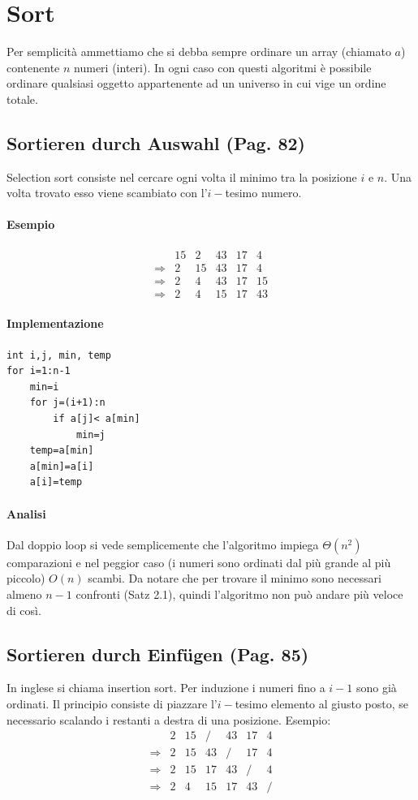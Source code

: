 \documentclass[a4paper]{book}
\newcommand{\lstIndent}{4}
\begin{document}
\chapter{Sort}
Per semplicità ammettiamo che si debba sempre ordinare un array (chiamato $a$) contenente $n$ numeri (interi). In ogni caso con questi algoritmi è possibile ordinare qualsiasi oggetto appartenente ad un universo in cui vige un ordine totale.
\section{Sortieren durch Auswahl (Pag. 82)}
Selection sort consiste nel cercare ogni volta il minimo tra la posizione $i$ e $n$. Una volta trovato esso viene scambiato con l'$i-$tesimo numero. 
\subsubsection*{Esempio}
\[\begin{array}{*{20}{c}}
{}&{15}&2&{43}&{17}&4\\
{\Rightarrow}&2&{15}&{43}&{17}&4\\
{\Rightarrow}&2&4&{43}&{17}&{15}\\
{\Rightarrow}&2&4&{15}&{17}&{43}
\end{array}\]
\subsubsection*{Implementazione}
\begin{lstlisting}[tabsize=\lstIndent]
int i,j, min, temp
for i=1:n-1
	min=i
	for j=(i+1):n
		if a[j]< a[min]
			min=j
	temp=a[min]
	a[min]=a[i]
	a[i]=temp
\end{lstlisting}
\subsubsection*{Analisi}

Dal doppio loop si vede semplicemente che l'algoritmo impiega $\Theta (n^2)$ comparazioni e nel peggior caso (i numeri sono ordinati dal più grande al più piccolo) $O(n)$ scambi. Da notare che per trovare il minimo sono necessari almeno $n-1$ confronti (Satz 2.1), quindi l'algoritmo non può andare più veloce di così. 
\section{Sortieren durch Einfügen (Pag. 85)}
In inglese si chiama insertion sort. Per induzione i numeri fino a $i-1$ sono già ordinati. Il principio consiste di piazzare l'$i-$tesimo elemento al giusto posto, se necessario scalando i restanti a destra di una posizione. Esempio:
\[\begin{array}{*{20}{c}}
{}&2&{15}&/&{43}&{17}&4\\
{\Rightarrow}&2&{15}&{43}&/&{17}&4\\
{\Rightarrow}&2&{15}&{17}&{43}&/&4\\
{\Rightarrow}&2&4&{15}&{17}&{43}&/
\end{array}\]
\end{document}
